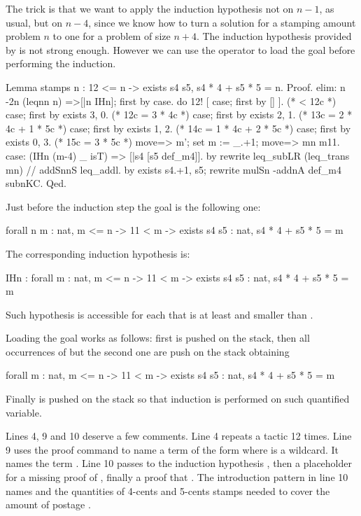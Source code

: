 The trick is that we want to apply the induction hypothesis not
on $n-1$, as usual, but on $n-4$, since we know how to turn a
solution for a stamping amount problem $n$ to one for a problem of
size $n+4$.  The induction hypothesis provided by 
is not strong enough.  However we can use the \C{:} operator
to load the goal before performing the induction.

\begin{coq}{}{}
Lemma stamps n : 12 <= n -> exists s4 s5, s4 * 4 + s5 * 5 = n.
Proof.
elim: n {-2}n (leqnn n) =>[|n IHn]; first by case.
do 12! [ case; first by [] ]. (* < 12c *)
case; first by exists 3, 0.   (* 12c = 3 * 4c *)
case; first by exists 2, 1.   (* 13c = 2 * 4c + 1 * 5c *)
case; first by exists 1, 2.   (* 14c = 1 * 4c + 2 * 5c *)
case; first by exists 0, 3.   (* 15c = 3 * 5c *)
move=> m'; set m := _.+1; move=> mn m11.
case: (IHn (m-4) _ isT) => [|s4 [s5 def_m4]].
  by rewrite leq_subLR (leq_trans mn) // addSnnS leq_addl.
by exists s4.+1, s5; rewrite mulSn -addnA def_m4 subnKC.
Qed.
\end{coq}

Just before the induction step the goal is the following one:

\begin{coq}{}{}
forall n m : nat,
  m <= n -> 11 < m -> exists s4 s5 : nat, s4 * 4 + s5 * 5 = m	
\end{coq}
The corresponding induction hypothesis  is:

\begin{coq}{}{}
IHn : forall m : nat,
      m <= n ->
      11 < m -> exists s4 s5 : nat, s4 * 4 + s5 * 5 = m
\end{coq}
Such hypothesis is accessible for each  that is at least 
and smaller than .

Loading the goal works as follows: first  is pushed on
the stack, then all occurrences of  but the second one are push
on the stack obtaining

\begin{coq}{}{}
forall m : nat,
  m <= n -> 11 < m -> exists s4 s5 : nat, s4 * 4 + s5 * 5 = m
\end{coq}
Finally  is pushed on the stack so that induction is performed
on such quantified variable.

Lines 4, 9 and 10 deserve a few comments.  Line 4 repeats a tactic
12 times.  Line 9 uses the  proof command to name  a
term of the form  where \C{_} is a wildcard. It names
 the term .  Line 10 passes to the induction
hypothesis , then a placeholder for a missing proof
of , finally a proof that .  The introduction
pattern in line 10 names  and  the quantities of
4-cents and 5-cents stamps needed to cover the amount of postage .


